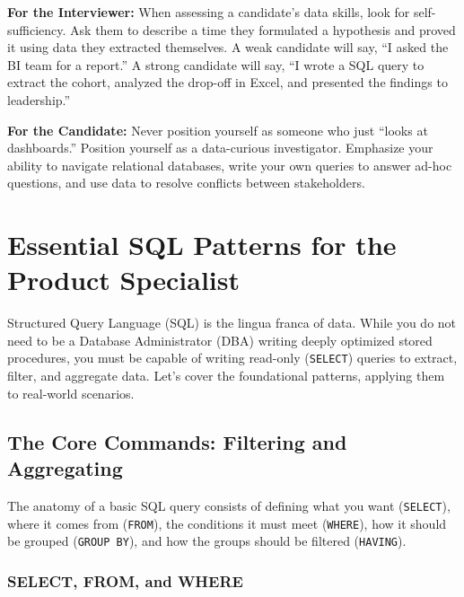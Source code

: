 \documentclass[
  11pt,
  openany,
  oneside]{book}
\renewenvironment{quote}{\begin{customquote}}{\end{customquote}}
\begin{document}
\begin{quote}
\textbf{For the Interviewer:} When assessing a candidate's data skills,
look for self-sufficiency. Ask them to describe a time they formulated a
hypothesis and proved it using data they extracted themselves. A weak
candidate will say, ``I asked the BI team for a report.'' A strong
candidate will say, ``I wrote a SQL query to extract the cohort,
analyzed the drop-off in Excel, and presented the findings to
leadership.''
\end{quote}

\begin{quote}
\textbf{For the Candidate:} Never position yourself as someone who just
``looks at dashboards.'' Position yourself as a data-curious
investigator. Emphasize your ability to navigate relational databases,
write your own queries to answer ad-hoc questions, and use data to
resolve conflicts between stakeholders.
\end{quote}

\bigskip

\section{Essential SQL Patterns for the Product
Specialist}\label{essential-sql-patterns-for-the-product-specialist}

Structured Query Language (SQL) is the lingua franca of data. While you
do not need to be a Database Administrator (DBA) writing deeply
optimized stored procedures, you must be capable of writing read-only
(\texttt{SELECT}) queries to extract, filter, and aggregate data. Let's
cover the foundational patterns, applying them to real-world scenarios.

\subsection{The Core Commands: Filtering and
Aggregating}\label{the-core-commands-filtering-and-aggregating}

The anatomy of a basic SQL query consists of defining what you want
(\texttt{SELECT}), where it comes from (\texttt{FROM}), the conditions
it must meet (\texttt{WHERE}), how it should be grouped
(\texttt{GROUP\ BY}), and how the groups should be filtered
(\texttt{HAVING}).

\subsubsection{SELECT, FROM, and WHERE}\label{select-from-and-where}
\end{document}

